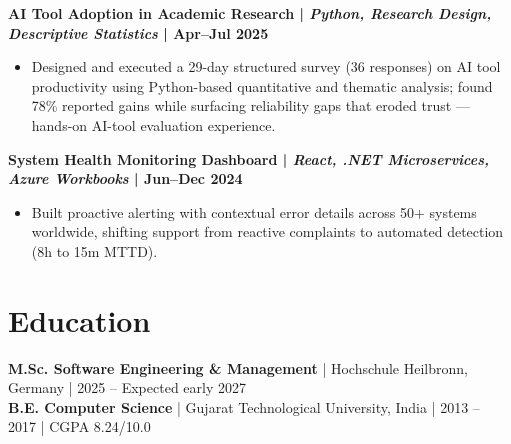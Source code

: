 \documentclass[letterpaper,10pt]{article}
\begin{document}
\noindent\textbf{AI Tool Adoption in Academic Research | \textit{Python, Research Design, Descriptive Statistics} | Apr–Jul 2025}\\
\begin{itemize}[leftmargin=0.15in,topsep=2pt,itemsep=2pt,parsep=0pt]
\item\small{Designed and executed a 29-day structured survey (36 responses) on AI tool productivity using Python-based quantitative and thematic analysis; found 78\% reported gains while surfacing reliability gaps that eroded trust — hands-on AI-tool evaluation experience.}
\end{itemize}

\noindent\textbf{System Health Monitoring Dashboard | \textit{React, .NET Microservices, Azure Workbooks} | Jun–Dec 2024}\\
\begin{itemize}[leftmargin=0.15in,topsep=2pt,itemsep=2pt,parsep=0pt]
\item\small{Built proactive alerting with contextual error details across 50+ systems worldwide, shifting support from reactive complaints to automated detection (8h to 15m MTTD).}
\end{itemize}


\section{Education}
{\small \textbf{M.Sc. Software Engineering \& Management} | Hochschule Heilbronn, Germany | 2025 – Expected early 2027}\\
{\small \textbf{B.E. Computer Science} | Gujarat Technological University, India | 2013 – 2017 | CGPA 8.24/10.0}
\end{document}
